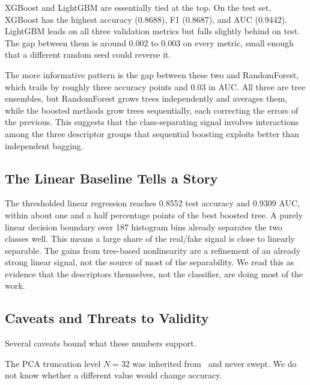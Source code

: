 \documentclass[runningheads]{llncs}
\begin{document}
XGBoost and LightGBM are essentially tied at the top. On the test set, XGBoost has the highest accuracy (0.8688), F1 (0.8687), and AUC (0.9442). LightGBM leads on all three validation metrics but falls slightly behind on test. The gap between them is around 0.002 to 0.003 on every metric, small enough that a different random seed could reverse it.

The more informative pattern is the gap between these two and RandomForest, which trails by roughly three accuracy points and 0.03 in AUC. All three are tree ensembles, but RandomForest grows trees independently and averages them, while the boosted methods grow trees sequentially, each correcting the errors of the previous. This suggests that the class-separating signal involves interactions among the three descriptor groups that sequential boosting exploits better than independent bagging.



\subsection{The Linear Baseline Tells a Story}

The thresholded linear regression reaches 0.8552 test accuracy and 0.9309 AUC, within about one and a half percentage points of the best boosted tree. A purely linear decision boundary over 187 histogram bins already separates the two classes well. This means a large share of the real/fake signal is close to linearly separable. The gains from tree-based nonlinearity are a refinement of an already strong linear signal, not the source of most of the separability. We read this as evidence that the descriptors themselves, not the classifier, are doing most of the work.


\subsection{Caveats and Threats to Validity}

Several caveats bound what these numbers support.

The PCA truncation level $N = 32$ was inherited from~\cite{xie2026} and never swept. We do not know whether a different value would change accuracy.
\end{document}
